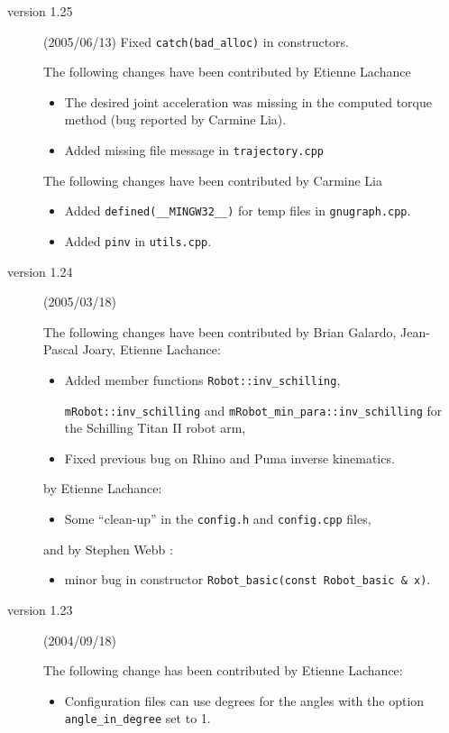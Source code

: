 \documentclass[dvips,11pt,fleqn]{report}
\begin{document}
\begin{description}
\item[version 1.25] (2005/06/13)
  Fixed \texttt{catch(bad\_alloc)} in constructors.
  
  The following changes have been contributed by Etienne Lachance
  \begin{itemize}
  \item The desired joint acceleration was missing in the computed
    torque method (bug reported by Carmine Lia).
  \item Added missing file message in \texttt{trajectory.cpp}
  \end{itemize}
  The following changes have been contributed by Carmine Lia
  \begin{itemize}
  \item Added \texttt{defined(\_\_MINGW32\_\_)} for temp files in
    \texttt{gnugraph.cpp}.
  \item Added \texttt{pinv} in \texttt{utils.cpp}.
  \end{itemize}

\item[version 1.24] (2005/03/18) 
  
  The following changes have been contributed by Brian Galardo,
  Jean-Pascal Joary, Etienne Lachance:
  \begin{itemize}
  \item Added member functions \texttt{Robot::inv\_schilling}, \par
    \texttt{mRobot::inv\_schilling} and
    \texttt{mRobot\_min\_para::inv\_schilling} for the
    \textsf{Schilling Titan II} robot arm,
  \item Fixed previous bug on Rhino and Puma inverse kinematics.
  \end{itemize}
  by Etienne Lachance: 
  \begin{itemize}
  \item Some ``clean-up'' in the \texttt{config.h} and
    \texttt{config.cpp} files,
  \end{itemize}
  and by Stephen Webb :
  \begin{itemize}
  \item minor bug in constructor \texttt{Robot\_basic(const
      Robot\_basic \& x)}.
  \end{itemize}

\item[version 1.23] (2004/09/18) 

  The following change has been contributed by Etienne Lachance: 
  \begin{itemize}
  \item Configuration files can use degrees for the angles with the
    option \texttt{angle\_in\_degree} set to 1.
  \end{itemize}


\end{description}
\end{document}

